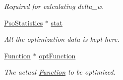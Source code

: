 \begin{CompactItemize}
\begin{CompactList}\small\item\em Required for calculating delta\_\-w. \item\end{CompactList}\item 
\hyperlink{classPsoStatistics}{PsoStatistics} $\ast$ \hyperlink{classPSO_eb06f00703c13f9bce37dcd19f85878a}{stat}
\begin{CompactList}\small\item\em All the optimization data is kept here. \item\end{CompactList}\item 
\hyperlink{classFunction}{Function} $\ast$ \hyperlink{classPSO_2e4ade153c87e3ebd19c7e02ce2f8522}{optFunction}
\begin{CompactList}\small\item\em The actual \hyperlink{classFunction}{Function} to be optimized. \item\end{CompactList}\end{CompactItemize}
